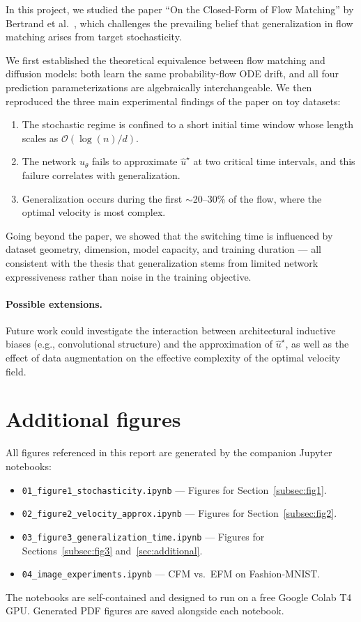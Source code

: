 \documentclass[10pt,a4paper]{article}
\theoremstyle{definition}
\begin{document}
In this project, we studied the paper ``On the Closed-Form of Flow Matching'' by Bertrand et al.~\cite{bertrand2025closed}, which challenges the prevailing belief that generalization in flow matching arises from target stochasticity.

We first established the theoretical equivalence between flow matching and diffusion models: both learn the same probability-flow ODE drift, and all four prediction parameterizations are algebraically interchangeable.
We then reproduced the three main experimental findings of the paper on toy datasets:
\begin{enumerate}[nosep,leftmargin=1.5em]
    \item The stochastic regime is confined to a short initial time window whose length scales as $\mathcal{O}(\log(n)/d)$.
    \item The network $u_\theta$ fails to approximate $\hat{u}^\star$ at two critical time intervals, and this failure correlates with generalization.
    \item Generalization occurs during the first $\sim$20--30\% of the flow, where the optimal velocity is most complex.
\end{enumerate}
Going beyond the paper, we showed that the switching time is influenced by dataset geometry, dimension, model capacity, and training duration --- all consistent with the thesis that generalization stems from limited network expressiveness rather than noise in the training objective.

\paragraph{Possible extensions.}
Future work could investigate the interaction between architectural inductive biases (e.g., convolutional structure) and the approximation of $\hat{u}^\star$, as well as the effect of data augmentation on the effective complexity of the optimal velocity field.




\appendix
\section{Additional figures}\label{app:figures}

All figures referenced in this report are generated by the companion Jupyter notebooks:
\begin{itemize}[nosep,leftmargin=1.5em]
    \item \texttt{01\_figure1\_stochasticity.ipynb} --- Figures for Section~\ref{subsec:fig1}.
    \item \texttt{02\_figure2\_velocity\_approx.ipynb} --- Figures for Section~\ref{subsec:fig2}.
    \item \texttt{03\_figure3\_generalization\_time.ipynb} --- Figures for Sections~\ref{subsec:fig3} and~\ref{sec:additional}.
    \item \texttt{04\_image\_experiments.ipynb} --- CFM vs.\ EFM on Fashion-MNIST.
\end{itemize}
The notebooks are self-contained and designed to run on a free Google Colab T4 GPU.
Generated PDF figures are saved alongside each notebook.
\end{document}
